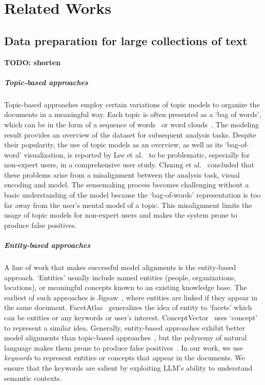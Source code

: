 \section{Related Works}
\subsection{Data preparation for large collections of text}
\textbf{TODO: shorten}
\subparagraph*{Topic-based approaches} 
Topic-based approaches employ certain variations of topic models to organize the documents in a meaningful way.
Each topic is often presented as a `bag of words', which can be in the form of a sequence of words~\cite{yang2017vistopic, cho2016vairoma, dou2013hierarchicaltopics,yan2019clfsemi,han2022hisva, alexander2014serendip, lee2012ivisclustering} or word clouds~\cite{oelke2014topiccoin, cho2016vairoma}.
The modeling result provides an overview of the dataset for subsequent analysis tasks. 
Despite their popularity, the use of topic models as an overview, as well as its `bag-of-word' visualization, is reported by Lee et al.~\cite{lee2017humantopicmodel} to be problematic, especially for non-expert users, in a comprehensive user study.
Chuang et al.~\cite{chuang2012interpretation} concluded that these problems arise from a misalignment between the analysis task, visual encoding and model.
The sensemaking process becomes challenging without a basic understanding of the model because the `bag-of-words' representation is too far away from the user's mental model of a topic.
This misalignment limits the usage of topic models for non-expert users and makes the system prone to produce false positives.

\vspace*{-0.2cm}
\subparagraph*{Entity-based approaches}
A line of work that makes successful model alignments is the entity-based approach.
`Entities' usually include named entities (people, organizations, locations), or meaningful concepts known to an existing knowledge base.
The earliest of such approaches is Jigsaw~\cite{Stasko2007jigasw}, where entities are linked if they appear in the same document.
FacetAtlas~\cite{cao2010facetatlas} generalizes the idea of entity to `facets' which can be entities or any keywords or user's interest.
ConceptVector~\cite{park2018conceptvector} uses `concept' to represent a similar idea. 
Generally, entity-based approaches exhibit better model alignments than topic-based approaches~\cite{chuang2012interpretation}, 
but the polysemy of natural language makes them prone to produce false positives~\cite{park2018conceptvector}.
In our work, we use \textit{keywords} to represent entities or concepts that appear in the documents.
We ensure that the keywords are salient by exploiting LLM's ability to understand semantic contexts.


